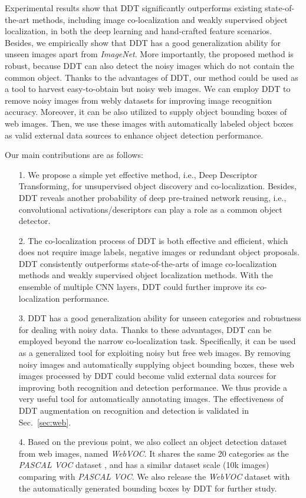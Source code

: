 \documentclass[twocolumn]{svjour3}          \smartqed  \usepackage{graphicx}
\begin{document}
Experimental results show that DDT significantly outperforms existing state-of-the-art methods, including image co-localization and weakly supervised object localization, in both the deep learning and hand-crafted feature scenarios. Besides, we empirically show that DDT has a good generalization ability for unseen images apart from \emph{ImageNet}. More importantly, the proposed method is robust, because DDT can also detect the noisy images which do not contain the common object. Thanks to the advantages of DDT, our method could be used as a tool to harvest easy-to-obtain but noisy web images. We can employ DDT to remove noisy images from webly datasets for improving image recognition accuracy. Moreover, it can be also utilized to supply object bounding boxes of web images. Then, we use these images with automatically labeled object boxes as valid external data sources to enhance object detection performance.

Our main contributions are as follows:
\begin{enumerate}
\item[1.] We propose a simple yet effective method, i.e., Deep Descriptor Transforming, for unsupervised object discovery and co-localization. Besides, DDT reveals another probability of deep pre-trained network reusing, i.e., convolutional activations/descriptors can play a role as a common object detector. 
\item[2.] The co-localization process of DDT is both effective and efficient, which does not require image labels, negative images or redundant object proposals. DDT consistently outperforms state-of-the-arts of image co-localization methods and weakly supervised object localization methods. With the ensemble of multiple CNN layers, DDT could further improve its co-localization performance.
\item[3.] DDT has a good generalization ability for unseen categories and robustness for dealing with noisy data. Thanks to these advantages, DDT can be employed beyond the narrow co-localization task. Specifically, it can be used as a generalized tool for exploiting noisy but free web images. By removing noisy images and automatically supplying object bounding boxes, these web images processed by DDT could become valid external data sources for improving both recognition and detection performance. We thus provide a very useful tool for automatically annotating images. The effectiveness of DDT augmentation on recognition and detection is validated in Sec.~\ref{sec:web}.
\item[4.] Based on the previous point, we also collect an object detection dataset from web images, named \emph{WebVOC}. It shares the same 20 categories as the \emph{PASCAL VOC} dataset \citep{voc2015}, and has a similar dataset scale (10k images) comparing with \emph{PASCAL VOC}. We also release the \emph{WebVOC} dataset with the automatically generated bounding boxes by DDT for further study. 
\end{enumerate}
\end{document}
